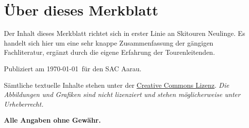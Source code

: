 \section*{Über dieses Merkblatt}

Der Inhalt dieses Merkblatt richtet sich in erster Linie an Skitouren Neulinge.
Es handelt sich hier um eine sehr knappe Zusammenfassung der gängigen Fachliteratur, ergänzt durch die eigene Erfahrung der Tourenleitenden.


Publiziert am \today\ für den SAC Aarau.

Sämtliche textuelle Inhalte stehen unter der \href{https://creativecommons.org/licenses/by/4.0/deed.de}{Creative Commons Lizenz}.
\textit{Die Abbildungen und Grafiken sind nicht lizenziert und stehen möglicherweise unter Urheberrecht.}

\textbf{Alle Angaben ohne Gewähr.}
